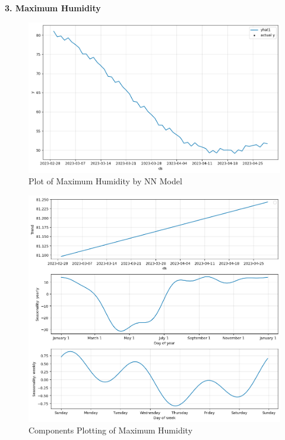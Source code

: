 \textbf{3. Maximum Humidity}
\begin{figure}[hbt!]
  \centering
  \includegraphics[width=0.7\linewidth]{images/outputs/neural hum_max.png}
  \caption{Plot of Maximum Humidity by NN Model}
\end{figure}


 \begin{figure}[hbt!]
  \centering
  \includegraphics[width=0.7\linewidth]{images/outputs/neural hum_max trend.png}
  \caption{Components Plotting of Maximum Humidity}
\end{figure}
